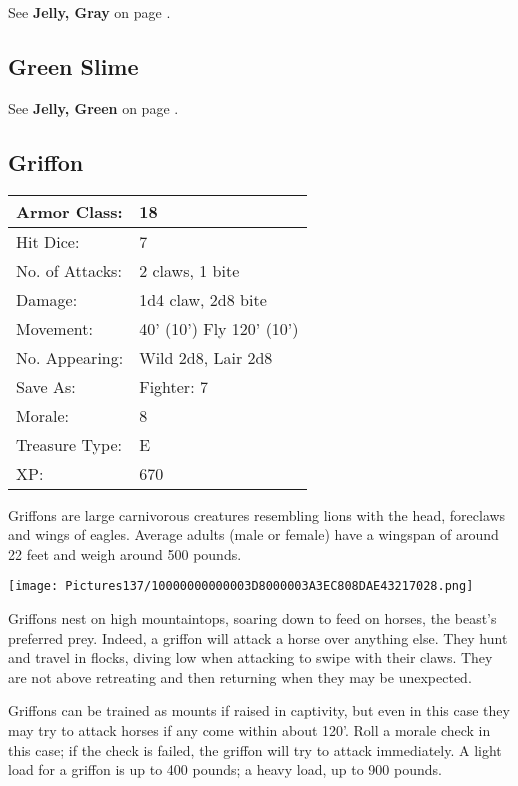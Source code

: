 \documentclass[a4paper,twoside,openany,10pt]{book}
\begin{document}
\begin{multicols}{2}
See \textbf{Jelly, Gray }on page \hyperlink{jelly-gray-gray-ooze}{\pageref{jelly-gray-gray-ooze}}.

\subsection*{Green Slime}\label{green-slime}

See \textbf{Jelly, Green} on page \hyperlink{jelly-green-green-slime}{\pageref{jelly-green-green-slime}}.

\subsection*{Griffon}\label{griffon}

\begin{tabularx}{0.48\textwidth}{@{}lX@{}}
Armor Class: & 18 \\\hline
Hit Dice: & 7 \\\hline
No. of Attacks: & 2 claws, 1 bite \\\hline
Damage: & 1d4 claw, 2d8 bite \\\hline
Movement: & 40' (10') Fly
120' (10') \\\hline
No. Appearing: & Wild 2d8, Lair 2d8 \\\hline
Save As: & Fighter: 7 \\\hline
Morale: & 8 \\\hline
Treasure Type: & E \\\hline
XP: & 670 \\\hline
\end{tabularx}\medskip

Griffons are large carnivorous creatures resembling lions with the head, foreclaws and wings of eagles. Average adults (male or female) have a wingspan of around 22 feet and weigh around 500 pounds.

\begin{center}
	\texttt{[image: Pictures137/10000000000003D8000003A3EC808DAE43217028.png]}
\end{center}

Griffons nest on high mountaintops, soaring down to feed on horses, the beast's preferred prey. Indeed, a griffon will attack a horse over anything else. They hunt and travel in flocks, diving low when attacking to swipe with their claws. They are not above retreating and then returning when they may be unexpected.

Griffons can be trained as mounts if raised in captivity, but even in this case they may try to attack horses if any come within about 120'. Roll a morale check in this case; if the check is failed, the griffon will try to attack immediately. A light load for a griffon is up to 400 pounds; a heavy load, up to 900 pounds.



\end{multicols}
\end{document}
